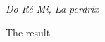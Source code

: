 \documentclass[preview]{standalone}
\begin{document}
\begin{center}
\emph{Do Ré Mi, La perdrix}

The result
\end{center}
\end{document}
